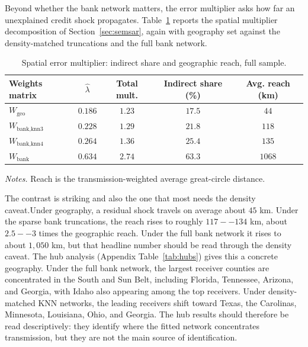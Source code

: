 Beyond whether the bank network matters, the error multiplier asks how far an
unexplained credit shock propagates. Table~\ref{tab:reach} reports the spatial
multiplier decomposition of Section~\ref{sec:semsar}, again with geography set
against the density-matched truncations and the full bank network.

\begin{table}[htbp]
  \centering
  \caption{Spatial error multiplier: indirect share and geographic reach, full sample.}
  \label{tab:reach}
  \begin{tabular}{lcccc}
    \toprule
    Weights matrix & $\hat\lambda$ & Total mult. & Indirect share (\%) & Avg. reach (km) \\
    \midrule
    $W_{\text{geo}}$ & $0.186$ & $1.23$ & $17.5$ & $44$ \\
    $W_{\text{bank,knn3}}$ & $0.228$ & $1.29$ & $21.8$ & $118$ \\
    $W_{\text{bank,knn4}}$ & $0.264$ & $1.36$ & $25.4$ & $135$ \\
    $W_{\text{bank}}$ & $0.634$ & $2.74$ & $63.3$ & $1068$ \\
    \bottomrule
  \end{tabular}
  \begin{tablenotes}\footnotesize
  \item \emph{Notes.} Reach is the transmission-weighted average great-circle distance.
  \end{tablenotes}
\end{table}

The contrast is striking and also the one that most needs
the density caveat.Under geography, a residual shock travels on average about $45$ km. Under the sparse
bank truncations, the reach rises to roughly $117--134$ km, about $2.5--3$ times the
geographic reach. Under the full bank network it rises to about $1,050$ km, but that
headline number should be read through the density caveat. The hub analysis (Appendix Table~\ref{tab:hubs}) gives this a concrete
geography. Under the full bank network,
the largest receiver counties are concentrated in the South and Sun Belt, including
Florida, Tennessee, Arizona, and Georgia, with Idaho also appearing among the top
receivers. Under density-matched KNN networks, the leading receivers shift toward
Texas, the Carolinas, Minnesota, Louisiana, Ohio, and Georgia. The hub results should
therefore be read descriptively: they identify where the fitted network concentrates
transmission, but they are not the main source of identification.

